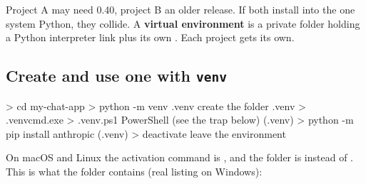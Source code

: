 Project A may need  0.40, project B an older release. If both install into the one
system Python, they collide. A \textbf{virtual environment} is a private folder holding a Python
interpreter link plus its own . Each project gets its own.

\begin{center}
\end{center}

\subsection{Create and use one with \texttt{venv}}

\begin{rawcode}
> cd my-chat-app
> python -m venv .venv                  create the folder .venv
> .venv\Scripts\activate                cmd.exe
> .venv\Scripts\Activate.ps1            PowerShell  (see the trap below)
(.venv) > python -m pip install anthropic
(.venv) > deactivate                    leave the environment
\end{rawcode}

On macOS and Linux the activation command is , and the folder is
 instead of . This is what the folder contains (real listing on Windows):

